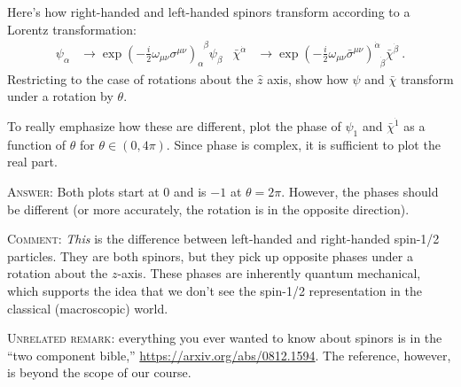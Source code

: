 \documentclass[12pt]{article}
\begin{document}
Here's how right-handed and left-handed spinors transform according to a Lorentz transformation:
\begin{align}
	\psi_\alpha &\to \exp\left(
		-\frac i2 \omega_{\mu\nu} \sigma^{\mu\nu}\right)_\alpha^{\phantom\alpha \beta} \psi_\beta
	&
	\bar\chi^{\dot\alpha}
	&\to \exp\left(-\frac i2 \omega_{\mu\nu} \bar\sigma^{\mu\nu}\right)^{\dot\alpha}_{\phantom\alpha \dot\beta} \bar\chi^{\dot\beta} \ .
\end{align}
Restricting to the case of rotations about the $\hat z$ axis, show how $\psi$ and $\bar\chi$ transform under a rotation by $\theta$. 

To really emphasize how these are different, plot the phase of $\psi_1$ and $\bar\chi^{\dot 1}$ as a function of $\theta$ for $\theta \in (0, 4\pi)$. Since phase is complex, it is sufficient to plot the real part. 

\textsc{Answer}: Both plots start at 0 and is $-1$ at $\theta = 2\pi$. However, the phases should be different (or more accurately, the rotation is in the opposite direction). 

\textsc{Comment}: \emph{This} is the difference between left-handed and right-handed spin-1/2 particles. They are both spinors, but they pick up opposite phases under a rotation about the $z$-axis. These phases are inherently quantum mechanical, which supports the idea that we don't see the spin-1/2 representation in the classical (macroscopic) world. 

\textsc{Unrelated remark}: everything you ever wanted to know about spinors is in the ``two component bible,'' \url{https://arxiv.org/abs/0812.1594}. The reference, however, is beyond the scope of our course.

\end{document}
